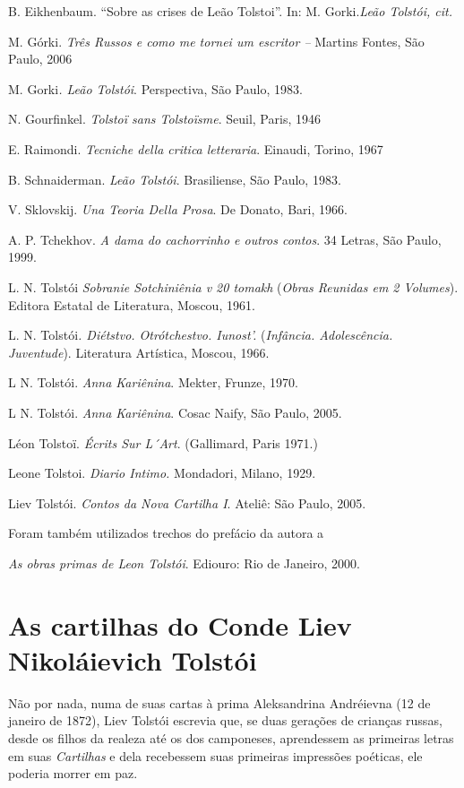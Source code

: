 B. Eikhenbaum. ``Sobre as crises de Leão Tolstoi''. In: M.
Gorki.\emph{Leão Tolstói, cit.}

M. Górki. \emph{Três Russos e como me tornei um escritor -- }Martins
Fontes, São Paulo, 2006

M. Gorki\emph{. Leão Tolstói}. Perspectiva, São Paulo, 1983.

N. Gourfinkel. \emph{Tolstoï sans Tolstoïsme}. Seuil, Paris, 1946

E. Raimondi. \emph{Tecniche della critica letteraria}. Einaudi, Torino,
1967

B. Schnaiderman. \emph{Leão Tolstói}. Brasiliense, São Paulo, 1983.

V. Sklovskij. \emph{Una Teoria Della Prosa}. De Donato, Bari, 1966.

A. P. Tchekhov. \emph{A dama do cachorrinho e outros contos}. 34
Letras, São Paulo, 1999.

L. N. Tolstói \emph{Sobranie Sotchiniênia v 20 tomakh} (\emph{Obras
Reunidas em 2  Volumes}). Editora Estatal de Literatura, Moscou, 1961.

L. N. Tolstói\emph{. Diétstvo. Otrótchestvo. Iunost'.} (\emph{Infância.
Adolescência. Juventude}). Literatura Artística, Moscou, 1966.

L N. Tolstói. \emph{Anna Kariênina}. Mekter, Frunze, 1970.

L N. Tolstói. \emph{Anna Kariênina}. Cosac Naify, São Paulo, 2005.

Léon Tolstoï. \emph{ Écrits Sur L´Art}. (Gallimard, Paris 1971.)

Leone Tolstoi. \emph{Diario Intimo. } Mondadori, Milano, 1929.

Liev Tolstói. \emph{Contos da Nova Cartilha I}. Ateliê: São Paulo,
2005.

Foram também utilizados trechos do prefácio da autora a

\emph{As obras primas de Leon Tolstói}. Ediouro: Rio de Janeiro, 2000.

\chapter{As cartilhas do Conde Liev Nikoláievich Tolstói}

Não por nada, numa de suas cartas à prima Aleksandrina Andréievna (12 de
janeiro de 1872), Liev Tolstói escrevia que, se
duas gerações de crianças russas, desde os filhos da realeza até os dos
camponeses, aprendessem as primeiras letras em suas \emph{Cartilhas} e dela
recebessem suas primeiras impressões poéticas, ele poderia morrer em
paz.

